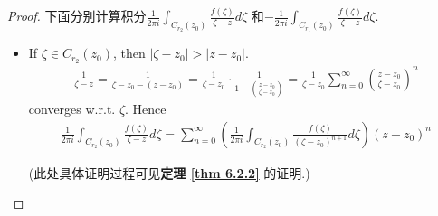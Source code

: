 \begin{thm}
\begin{proof}
			\vspace{2em}
			下面分别计算积分$\frac{1}{2 \pi i} \int_{C_{r_2}(z_0)}{\frac{f(\zeta)}{\zeta - z} d\zeta}$ 和$-\frac{1}{2 \pi i} \int_{C_{r_1}(z_0)}{\frac{f(\zeta)}{\zeta - z} d\zeta}$.
			\begin{itemize}
				\item If $\zeta \in C_{r_2}(z_0)$, then $\left| \zeta - z_0 \right| > \left| z - z_0 \right|$.
				\begin{align}
					\frac{1}{\zeta - z} 
					= \frac{1}{\zeta - z_0 - (z - z_0)} 
					= \frac{1}{\zeta - z_0} \cdot \frac{1}{1 - \left( \frac{z - z_0}{\zeta - z_0} \right)}
					= \frac{1}{\zeta - z_0} \sum_{n = 0}^{\infty}{\left( \frac{z - z_0}{\zeta - z_0} \right)^n}
				\end{align}
				converges  w.r.t. $\zeta$. Hence
				\begin{align}
					\frac{1}{2\pi i} \int_{C_{r_2}(z_0)}{\frac{f(\zeta)}{\zeta - z} d\zeta}
					= \sum_{n = 0}^{\infty}{\left( \frac{1}{2 \pi i} \int_{C_{r_2}(z_0)}{\frac{f(\zeta)}{(\zeta - z_0)^{n + 1} } d\zeta } \right) (z - z_0)^n}
				\end{align}
				\begin{center}
					(此处具体证明过程可见\textbf{定理 \ref{thm 6.2.2}} 的证明.)
				\end{center}
			
				\vspace{1em}
				

\end{itemize}
\end{proof}
\end{thm}

